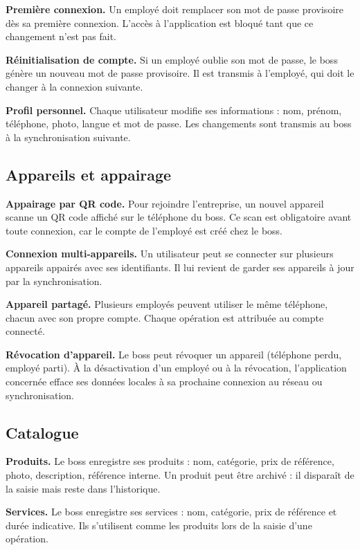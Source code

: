 \documentclass[11pt,a4paper]{article}
\newcommand{\fonc}[2]{\textbf{#1.} #2\par\vspace{0.2em}}
\begin{document}
	\fonc{Première connexion}{Un employé doit remplacer son mot de passe provisoire dès sa première connexion. L'accès à l'application est bloqué tant que ce changement n'est pas fait.}
	
	\fonc{Réinitialisation de compte}{Si un employé oublie son mot de passe, le boss génère un nouveau mot de passe provisoire. Il est transmis à l'employé, qui doit le changer à la connexion suivante.}
	
	\fonc{Profil personnel}{Chaque utilisateur modifie ses informations : nom, prénom, téléphone, photo, langue et mot de passe. Les changements sont transmis au boss à la synchronisation suivante.}
	
	\subsection{Appareils et appairage}
	
	\fonc{Appairage par QR code}{Pour rejoindre l'entreprise, un nouvel appareil scanne un QR code affiché sur le téléphone du boss. Ce scan est obligatoire avant toute connexion, car le compte de l'employé est créé chez le boss.}
	
	\fonc{Connexion multi-appareils}{Un utilisateur peut se connecter sur plusieurs appareils appairés avec ses identifiants. Il lui revient de garder ses appareils à jour par la synchronisation.}
	
	\fonc{Appareil partagé}{Plusieurs employés peuvent utiliser le même téléphone, chacun avec son propre compte. Chaque opération est attribuée au compte connecté.}
	
	\fonc{Révocation d'appareil}{Le boss peut révoquer un appareil (téléphone perdu, employé parti). À la désactivation d'un employé ou à la révocation, l'application concernée efface ses données locales à sa prochaine connexion au réseau ou synchronisation.}
	
	\subsection{Catalogue}
	
	\fonc{Produits}{Le boss enregistre ses produits : nom, catégorie, prix de référence, photo, description, référence interne. Un produit peut être archivé : il disparaît de la saisie mais reste dans l'historique.}
	
	\fonc{Services}{Le boss enregistre ses services : nom, catégorie, prix de référence et durée indicative. Ils s'utilisent comme les produits lors de la saisie d'une opération.}
	
\end{document}

